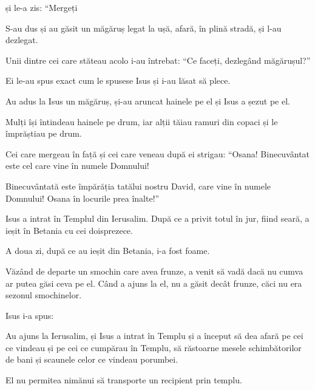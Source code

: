 {și le-a zis: “Mergeți
{}



\par }{\PP {}S-au dus și au găsit un măgăruș legat la ușă, afară, în plină stradă, și l-au dezlegat.

Unii dintre cei care stăteau acolo i-au întrebat: “Ce faceți, dezlegând măgărușul?”

Ei le-au spus exact cum le spusese Isus și i-au lăsat să plece.


\par }{\PP {}Au adus la Isus un măgăruș, și-au aruncat hainele pe el și Isus a șezut pe el.

Mulți își întindeau hainele pe drum, iar alții tăiau ramuri din copaci și le împrăștiau pe drum.

Cei care mergeau în față și cei care veneau după ei strigau: “Osana! Binecuvântat este cel care vine în numele Domnului!

Binecuvântată este împărăția tatălui nostru David, care vine în numele Domnului! Osana în locurile prea înalte!”


\par }{\PP {}Isus a intrat în Templul din Ierusalim. După ce a privit totul în jur, fiind seară, a ieșit în Betania cu cei doisprezece.


\par }{\PP {}A doua zi, după ce au ieșit din Betania, i-a fost foame.

Văzând de departe un smochin care avea frunze, a venit să vadă dacă nu cumva ar putea găsi ceva pe el. Când a ajuns la el, nu a găsit decât frunze, căci nu era sezonul smochinelor.

Isus i-a spus:
{}


\par }{\PP {}Au ajuns la Ierusalim, și Isus a intrat în Templu și a început să dea afară pe cei ce vindeau și pe cei ce cumpărau în Templu, să răstoarne mesele schimbătorilor de bani și scaunele celor ce vindeau porumbei.

El nu permitea nimănui să transporte un recipient prin templu.

}
